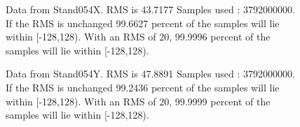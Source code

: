 \begin{figure}[h] 				 				 				\caption{Data from Stand054X. RMS is 43.7177 Samples used : 3792000000. If the RMS is unchanged 99.6627 percent of the samples will lie within [-128,128).  				 With an RMS of 20, 99.9996 percent of the samples will lie within [-128,128).} 				\end{figure} 

\begin{figure}[h] 				 				 				\caption{Data from Stand054Y. RMS is 47.8891 Samples used : 3792000000. If the RMS is unchanged 99.2436 percent of the samples will lie within [-128,128).  				 With an RMS of 20, 99.9999 percent of the samples will lie within [-128,128).} 				\end{figure} 

